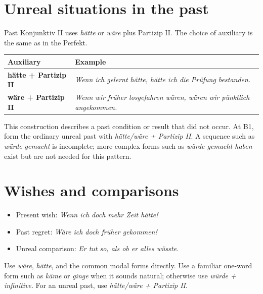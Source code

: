 \section{Unreal situations in the past}

Past Konjunktiv II uses \textit{hätte} or \textit{wäre} plus Partizip II\@. The
choice of auxiliary is the same as in the Perfekt.

\begin{center}
\small
{}
\begin{tabularx}{\textwidth}{@{}>{\bfseries}l X@{}}
\toprule
Auxiliary & Example \\
\midrule
hätte + Partizip II
  & \textit{Wenn ich gelernt hätte, hätte ich die Prüfung bestanden.} \\
wäre + Partizip II
  & \textit{Wenn wir früher losgefahren wären, wären wir pünktlich angekommen.} \\
\bottomrule
\end{tabularx}
\end{center}

This construction describes a past condition or result that did not occur.
At B1, form the ordinary unreal past with
\textit{hätte/wäre + Partizip II}. A sequence such as
\textit{würde gemacht} is incomplete; more complex forms such as
\textit{würde gemacht haben} exist but are not needed for this pattern.

\section{Wishes and comparisons}

\begin{itemize}[leftmargin=*]
  \item Present wish: \textit{Wenn ich doch mehr Zeit hätte!}
  \item Past regret: \textit{Wäre ich doch früher gekommen!}
  \item Unreal comparison: \textit{Er tut so, als ob er alles wüsste.}
\end{itemize}

\begin{tcolorbox}[
  colback=referenceBlueBg,
  colframe=genderMasculine,
  title={Choosing the form},
  fonttitle=\bfseries
]
Use \textit{wäre}, \textit{hätte}, and the common modal forms directly. Use a
familiar one-word form such as \textit{käme} or \textit{ginge} when it sounds
natural; otherwise use \textit{würde + infinitive}. For an unreal past, use
\textit{hätte/wäre + Partizip II}.
\end{tcolorbox}
